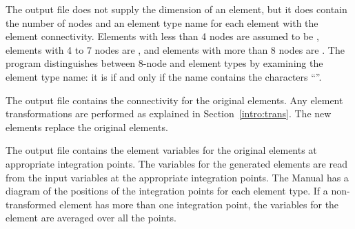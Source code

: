 The  output file does not supply the dimension of an
element, but it does contain the  number of nodes and an element type
name for each element with the element connectivity. Elements with less
than 4 nodes are assumed to be , elements with 4 to 7 nodes are
, and elements with more than 8 nodes are . The
program distinguishes between 8-node  and  element
types by examining the element type name: it is  if and only if
the name contains the characters ``''.

The  output file contains the connectivity for
the original elements.
Any element transformations are performed as explained in
Section~\ref{intro:trans}.
The new elements replace the original
elements.

The  output file contains the element variables
for the original elements at appropriate integration points.
The variables for the
generated elements are read from the input variables at the appropriate
integration points. The  Manual has a diagram of the
positions of the integration points for each element type. If a
non-transformed element has more than one integration point, the
variables for the element are averaged over all the points.
